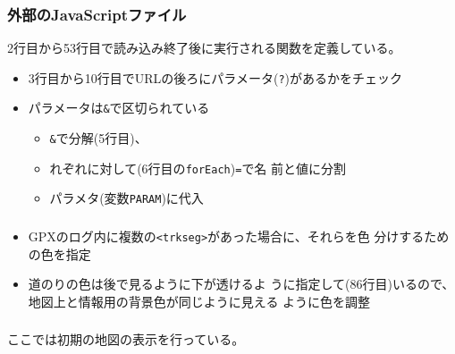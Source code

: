 \begin{frame}[containsverbatim]
 \frametitle{外部のJavaScriptファイル}
 2行目から53行目で読み込み終了後に実行される関数を定義している。
 \begin{itemize}
	\item 3行目から10行目でURLの後ろにパラメータ(\Verb+?+)があるかをチェック
	\item パラメータは\Verb+&+で区切られている
        \begin{itemize}
         \item \Verb+&+で分解(5行目)、
         \item れぞれに対して(6行目の\Verb+forEach+)\Verb+=+で名
				前と値に分割
         \item パラメタ(変数\Verb+PARAM+)に代入
        \end{itemize}
 \end{itemize}
\end{frame}
\begin{frame}[containsverbatim]
 \frametitle{}
 \begin{itemize}
  \item GPXのログ内に複数の\Verb+<trkseg>+があった場合に、それらを色
 分けするための色を指定
  \item 道のりの色は後で見るように下が透けるよ
 うに指定して(86行目)いるので、地図上と情報用の背景色が同じように見える
 ように色を調整
 \end{itemize}
\end{frame}
\begin{frame}[containsverbatim]
 \frametitle{}
  ここでは初期の地図の表示を行っている。
\end{frame}
\begin{frame}[containsverbatim]
 \frametitle{}
\end{frame}
